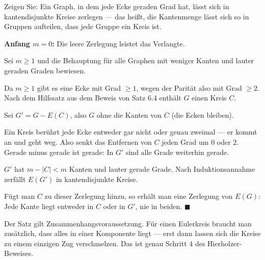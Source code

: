 \begin{aufgabe}
Zeigen Sie: Ein Graph, in dem jede Ecke geraden Grad hat, lässt sich in kantendisjunkte Kreise zerlegen --- das heißt, die Kantenmenge lässt sich so in Gruppen aufteilen, dass jede Gruppe ein Kreis ist.

\loesung
{}
\textbf{Anfang $m = 0$:} Die leere Zerlegung leistet das Verlangte.

Sei $m \ge 1$ und die Behauptung für alle Graphen mit weniger Kanten und lauter geraden Graden bewiesen.

Da $m \ge 1$ gibt es eine Ecke mit Grad $\ge 1$, wegen der Parität also mit Grad $\ge 2$. Nach dem Hilfssatz aus dem Beweis von Satz 6.4 enthält $G$ einen Kreis $C$.

Sei $G' = G - E(C)$, also $G$ ohne die Kanten von $C$ (die Ecken bleiben).

Ein Kreis berührt jede Ecke entweder gar nicht oder genau zweimal --- er kommt an und geht weg. Also senkt das Entfernen von $C$ jeden Grad um $0$ oder $2$. Gerade minus gerade ist gerade: In $G'$ sind alle Grade weiterhin gerade.

$G'$ hat $m - |C| < m$ Kanten und lauter gerade Grade. Nach Induktionsannahme zerfällt $E(G')$ in kantendisjunkte Kreise.

Fügt man $C$ zu dieser Zerlegung hinzu, so erhält man eine Zerlegung von $E(G)$: Jede Kante liegt entweder in $C$ oder in $G'$, nie in beiden. $\blacksquare$

Der Satz gilt  Zusammenhangsvoraussetzung. Für einen Eulerkreis braucht man zusätzlich, dass alles in einer Komponente liegt --- erst dann lassen sich die Kreise zu einem einzigen Zug verschmelzen. Das ist genau Schritt 4 des Hierholzer-Beweises.
\end{aufgabe}

